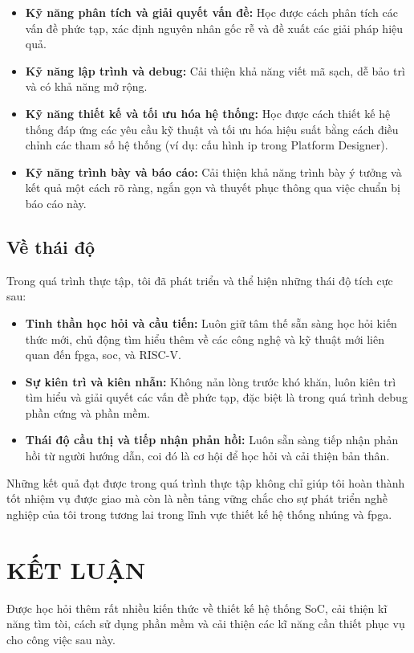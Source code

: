 \begin{itemize}
    \item \textbf{Kỹ năng phân tích và giải quyết vấn đề:} Học được cách phân tích các vấn đề phức tạp, xác định nguyên nhân gốc rễ và đề xuất các giải pháp hiệu quả.
    \item \textbf{Kỹ năng lập trình và debug:} Cải thiện khả năng viết mã sạch, dễ bảo trì và có khả năng mở rộng.
    \item \textbf{Kỹ năng thiết kế và tối ưu hóa hệ thống:} Học được cách thiết kế hệ thống đáp ứng các yêu cầu kỹ thuật và tối ưu hóa hiệu suất bằng cách điều chỉnh các tham số hệ thống (ví dụ: cấu hình \acrshort{ip} trong Platform Designer). 
    \item \textbf{Kỹ năng trình bày và báo cáo:} Cải thiện khả năng trình bày ý tưởng và kết quả một cách rõ ràng, ngắn gọn và thuyết phục thông qua việc chuẩn bị báo cáo này. 
\end{itemize}

\subsection{Về thái độ} 
\label{sec:attitude_developed}

Trong quá trình thực tập, tôi đã phát triển và thể hiện những thái độ tích cực sau:
\begin{itemize}
    \item \textbf{Tinh thần học hỏi và cầu tiến:} Luôn giữ tâm thế sẵn sàng học hỏi kiến thức mới, chủ động tìm hiểu thêm về các công nghệ và kỹ thuật mới liên quan đến \acrshort{fpga}, \acrshort{soc}, và RISC-V.
    \item \textbf{Sự kiên trì và kiên nhẫn:} Không nản lòng trước khó khăn, luôn kiên trì tìm hiểu và giải quyết các vấn đề phức tạp, đặc biệt là trong quá trình debug phần cứng và phần mềm.
    \item \textbf{Thái độ cầu thị và tiếp nhận phản hồi:} Luôn sẵn sàng tiếp nhận phản hồi từ người hướng dẫn, coi đó là cơ hội để học hỏi và cải thiện bản thân.
\end{itemize}

Những kết quả đạt được trong quá trình thực tập không chỉ giúp tôi hoàn thành tốt nhiệm vụ được giao mà còn là nền tảng vững chắc cho sự phát triển nghề nghiệp của tôi trong tương lai trong lĩnh vực thiết kế hệ thống nhúng và \acrshort{fpga}. 

\section{KẾT LUẬN}
\label{Chapter6}

Được học hỏi thêm rất nhiều kiến thức về thiết kế hệ thống SoC, cải thiện kĩ năng tìm tòi, cách sử dụng phần mềm và cải thiện các kĩ năng cần thiết phục vụ cho công việc sau này.